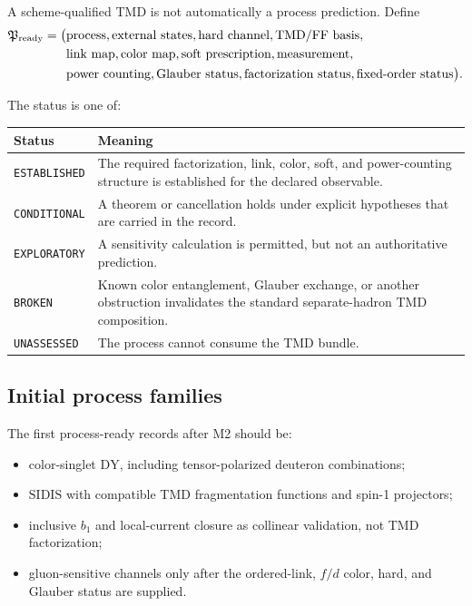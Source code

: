 \documentclass[11pt]{article}
\newcommand{\DY}{\mathrm{DY}}
\newcommand{\SIDIS}{\mathrm{SIDIS}}
\begin{document}
A scheme-qualified TMD is not automatically a process prediction.  Define
\begin{equation}
 \begin{aligned}
 \mathfrak P_{\rm ready}=\bigl(&
 \text{process},
 \text{external states},
 \text{hard channel},
 \text{TMD/FF basis},\notag\\
 &\text{link map},
 \text{color map},
 \text{soft prescription},
 \text{measurement},\notag\\
 &\text{power counting},
 \text{Glauber status},
 \text{factorization status},
 \text{fixed-order status}\bigr).
 \end{aligned}
 \label{eq:process-ready}
\end{equation}

The status is one of:
\begin{longtable}{L{0.23\textwidth}L{0.69\textwidth}}
\toprule
Status & Meaning\\
\midrule
\endhead
\texttt{ESTABLISHED} & The required factorization, link, color, soft, and power-counting structure is established for the declared observable.\\
\texttt{CONDITIONAL} & A theorem or cancellation holds under explicit hypotheses that are carried in the record.\\
\texttt{EXPLORATORY} & A sensitivity calculation is permitted, but not an authoritative prediction.\\
\texttt{BROKEN} & Known color entanglement, Glauber exchange, or another obstruction invalidates the standard separate-hadron TMD composition.\\
\texttt{UNASSESSED} & The process cannot consume the TMD bundle.\\
\bottomrule
\end{longtable}

\subsection{Initial process families}

The first process-ready records after M2 should be:
\begin{itemize}
\item color-singlet \(\DY\), including tensor-polarized deuteron combinations;
\item \(\SIDIS\) with compatible TMD fragmentation functions and spin-1 projectors;
\item inclusive \(b_1\) and local-current closure as collinear validation, not TMD factorization;
\item gluon-sensitive channels only after the ordered-link, \(f/d\) color, hard, and Glauber status are supplied.
\end{itemize}
\end{document}
